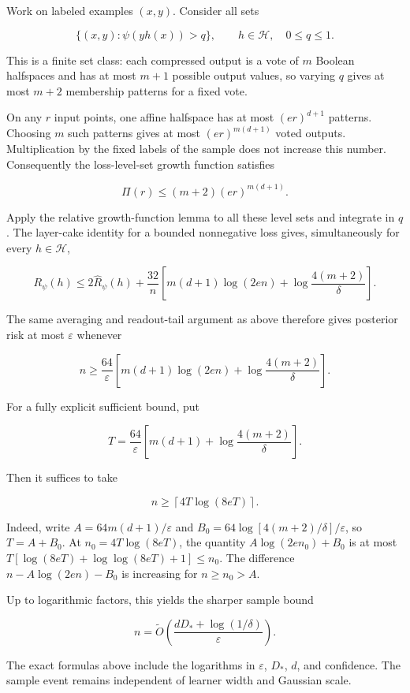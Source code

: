 \documentclass[11pt]{article}
\begin{document}
Work on labeled examples \((x,y)\). Consider all sets

\[
\{(x,y):\psi(yh(x))>q\},\qquad h\in\mathcal H,\quad 0\le q\le1.
\]

This is a finite set class: each compressed output is a vote of \(m\)
Boolean halfspaces and has at most \(m+1\) possible output values, so
varying \(q\) gives at most \(m+2\) membership patterns for a fixed
vote.

On any \(r\) input points, one affine halfspace has at most
\((er)^{d+1}\) patterns. Choosing \(m\) such patterns gives at most
\((er)^{m(d+1)}\) voted outputs. Multiplication by the fixed labels of
the sample does not increase this number. Consequently the
loss-level-set growth function satisfies

\[
\Pi(r)\le(m+2)(er)^{m(d+1)}.
\]

Apply the relative growth-function lemma to all these level sets and
integrate in \(q\). The layer-cake identity for a bounded nonnegative
loss gives, simultaneously for every \(h\in\mathcal H\),

\[
R_\psi(h)\le2\widehat R_\psi(h)
+\frac{32}{n}\left[m(d+1)\log(2en)
+\log\frac{4(m+2)}{\delta}\right].
\]

The same averaging and readout-tail argument as above therefore gives
posterior risk at most \(\varepsilon\) whenever

\[
\boxed{\quad n\ge\frac{64}{\varepsilon}
\left[m(d+1)\log(2en)+\log\frac{4(m+2)}{\delta}\right].\quad}
\]

For a fully explicit sufficient bound, put

\[
T=\frac{64}{\varepsilon}
\left[m(d+1)+\log\frac{4(m+2)}{\delta}\right].
\]

Then it suffices to take

\[
\boxed{\qquad n\ge\left\lceil4T\log(8eT)\right\rceil.\qquad}
\]

Indeed, write \(A=64m(d+1)/\varepsilon\) and
\(B_0=64\log[4(m+2)/\delta]/\varepsilon\), so \(T=A+B_0\). At
\(n_0=4T\log(8eT)\), the quantity \(A\log(2en_0)+B_0\) is at most
\(T[\log(8eT)+\log\log(8eT)+1]\le n_0\). The difference
\(n-A\log(2en)-B_0\) is increasing for \(n\ge n_0>A\).

Up to logarithmic factors, this yields the sharper sample bound

\[
\boxed{\quad n=\widetilde O\!\left(
\frac{dD_*+\log(1/\delta)}{\varepsilon}\right).\quad}
\]

The exact formulas above include the logarithms in \(\varepsilon\),
\(D_*\), \(d\), and confidence. The sample event remains independent of
learner width and Gaussian scale.
\end{document}
